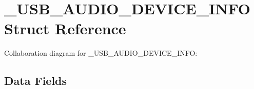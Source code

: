 \hypertarget{struct___u_s_b___a_u_d_i_o___d_e_v_i_c_e___i_n_f_o}{}\section{\+\_\+\+U\+S\+B\+\_\+\+A\+U\+D\+I\+O\+\_\+\+D\+E\+V\+I\+C\+E\+\_\+\+I\+N\+F\+O Struct Reference}
\label{struct___u_s_b___a_u_d_i_o___d_e_v_i_c_e___i_n_f_o}


Collaboration diagram for \+\_\+\+U\+S\+B\+\_\+\+A\+U\+D\+I\+O\+\_\+\+D\+E\+V\+I\+C\+E\+\_\+\+I\+N\+F\+O\+:
\subsection*{Data Fields}
